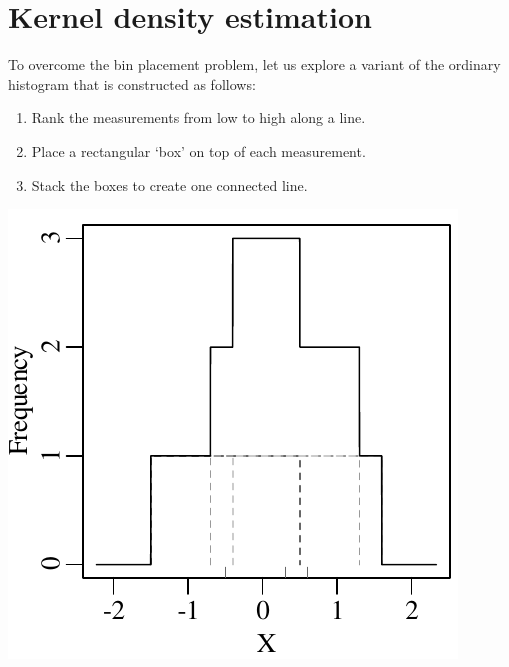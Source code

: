 \section{Kernel density estimation}\label{sec:KDE}

To overcome the bin placement problem, let us explore a variant of the
ordinary histogram that is constructed as follows:
\begin{enumerate}
\item Rank the measurements from low to high along a line.
\item Place a rectangular `box' on top of each measurement.
\item Stack the boxes to create one connected line.
\end{enumerate}
\noindent\begin{minipage}[t][][b]{.3\textwidth}
  \includegraphics[width=\textwidth]{../figures/rectKDE.pdf}\medskip
\end{minipage}
\begin{minipage}[t][][t]{.7\textwidth}
  \label{fig:rectangles}
\end{minipage}

